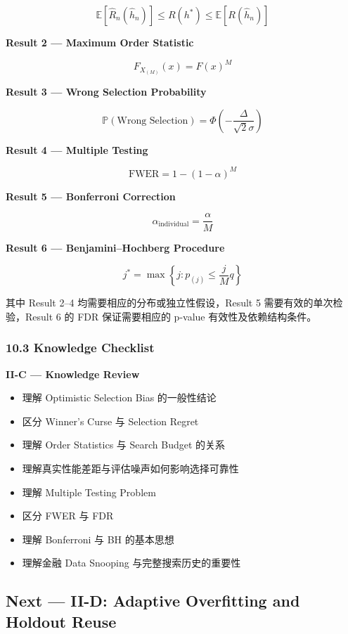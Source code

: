 \[\boxed{
\mathbb E[\widehat R_n(\hat h_n)]
\leq R(h^*)
\leq\mathbb E[R(\hat h_n)]
}\]

\textbf{Result 2 --- Maximum Order Statistic}

\[\boxed{
F_{X_{(M)}}(x)=F(x)^M
}\]

\textbf{Result 3 --- Wrong Selection Probability}

\[\boxed{
\mathbb P(\text{Wrong Selection})
=
\Phi\left(-\frac{\Delta}{\sqrt2\sigma}\right)
}\]

\textbf{Result 4 --- Multiple Testing}

\[\boxed{
\mathrm{FWER}=1-(1-\alpha)^M
}\]

\textbf{Result 5 --- Bonferroni Correction}

\[\boxed{
\alpha_{\mathrm{individual}}=\frac{\alpha}{M}
}\]

\textbf{Result 6 --- Benjamini--Hochberg Procedure}

\[\boxed{
j^*
=
\max\left\{
j:p_{(j)}\leq\frac{j}{M}q
\right\}
}\]

其中 Result 2--4 均需要相应的分布或独立性假设，Result 5 需要有效的单次检验，Result 6 的 FDR 保证需要相应的 p-value 有效性及依赖结构条件。

\hypertarget{part-2-16-0001-knowledge-checklist}{%
\subsubsection{10.3 Knowledge Checklist}\label{part-2-16-0001-knowledge-checklist}}

\textbf{II-C --- Knowledge Review}

\begin{itemize}
\item
  理解 Optimistic Selection Bias 的一般性结论
\item
  区分 Winner's Curse 与 Selection Regret
\item
  理解 Order Statistics 与 Search Budget 的关系
\item
  理解真实性能差距与评估噪声如何影响选择可靠性
\item
  理解 Multiple Testing Problem
\item
  区分 FWER 与 FDR
\item
  理解 Bonferroni 与 BH 的基本思想
\item
  理解金融 Data Snooping 与完整搜索历史的重要性
\end{itemize}

\hypertarget{part-2-16-0001-next-ii-d-adaptive-overfitting-and-holdout-reuse}{%
\subsection{Next --- II-D: Adaptive Overfitting and Holdout Reuse}\label{part-2-16-0001-next-ii-d-adaptive-overfitting-and-holdout-reuse}}

